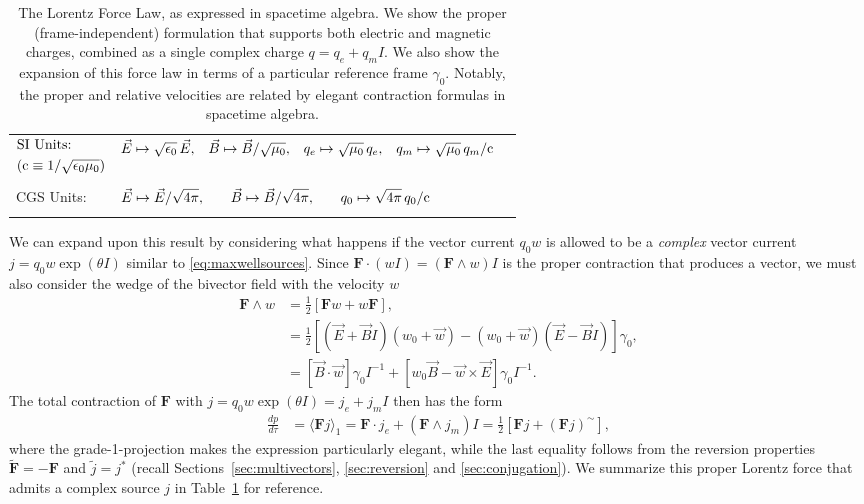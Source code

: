 \documentclass[1p,sort&compress]{elsarticle}
\numberwithin{equation}{section}
\newcommand{\rv}[1]{\vec{#1}}
\newcommand{\bv}[1]{\mathbf{#1}}
\newcommand{\mean}[1]{\langle #1 \rangle}
\newcommand{\cc}{{\rm c}}
\begin{document}
\begin{table}
\begin{tabular}{l l}
    {$\begin{aligned} & \text{SI Units:} \\ & (\cc\equiv 1/\sqrt{\epsilon_0\mu_0}) \end{aligned}$} & {$\begin{aligned}\rv{E} &\mapsto \sqrt{\epsilon_0}\,\rv{E}, & \rv{B} &\mapsto \rv{B}/\sqrt{\mu_0}, & q_e &\mapsto \sqrt{\mu_0}\,q_e, & q_m &\mapsto \sqrt{\mu_0}\,q_m/\cc \end{aligned}$} \\
    \\
    CGS Units: & {$\begin{aligned}\rv{E} &\mapsto \rv{E}/\sqrt{4\pi}, &\quad \rv{B} &\mapsto \rv{B}/\sqrt{4\pi}, &\quad q_0 &\mapsto \sqrt{4\pi}\,q_0/\cc \end{aligned}$} \\
    \\
    \hline 
 \end{tabular}
 \caption[Lorentz Force Law]{The Lorentz Force Law, as expressed in spacetime algebra.  We show the proper (frame-independent) formulation that supports both electric and magnetic charges, combined as a single complex charge $q = q_e + q_m I$.  We also show the expansion of this force law in terms of a particular reference frame $\gamma_0$.  Notably, the proper and relative velocities are related by elegant contraction formulas in spacetime algebra.}
 \label{tab:lorentz}
\end{table}

We can expand upon this result by considering what happens if the vector current $q_0w$ is allowed to be a \emph{complex} vector current $j = q_0w\exp(\theta I)$ similar to \eqref{eq:maxwellsources}.  Since $\bv{F}\cdot(w I) = (\bv{F}\wedge w)I$ is the proper contraction that produces a vector, we must also consider the wedge of the bivector field with the velocity $w$
\begin{align}\label{eq:fieldvectorwedge}
  \bv{F}\wedge w &= \frac{1}{2}[\bv{F}w + w\bv{F}], \\
  &= \frac{1}{2}[(\rv{E} + \rv{B}I)(w_0 + \rv{w}) - (w_0 + \rv{w})(\rv{E} - \rv{B}I)]\gamma_0, \nonumber \\
  &= [\rv{B}\cdot\rv{w}]\gamma_0I^{-1} + [w_0\rv{B} - \rv{w}\times\rv{E}]\gamma_0I^{-1}. \nonumber 
\end{align}
The total contraction of $\bv{F}$ with $j = q_0 w \exp(\theta I) = j_e + j_mI$ then has the form
\begin{align}\label{eq:lorentzforcecomplex}
  \frac{dp}{d\tau} &=  \mean{\bv{F} j}_1 = \bv{F}\cdot j_e + (\bv{F}\wedge j_m)I = \frac{1}{2}\left[\bv{F}j + (\bv{F}j)^\sim\right],
\end{align}
where the grade-1-projection makes the expression particularly elegant, while the last equality follows from the reversion properties $\widetilde{\bv{F}} = -\bv{F}$ and $\widetilde{j} = j^*$ (recall Sections~\ref{sec:multivectors}, \ref{sec:reversion} and \ref{sec:conjugation}).  We summarize this proper Lorentz force that admits a complex source $j$ in Table~\ref{tab:lorentz} for reference.
\end{document}
